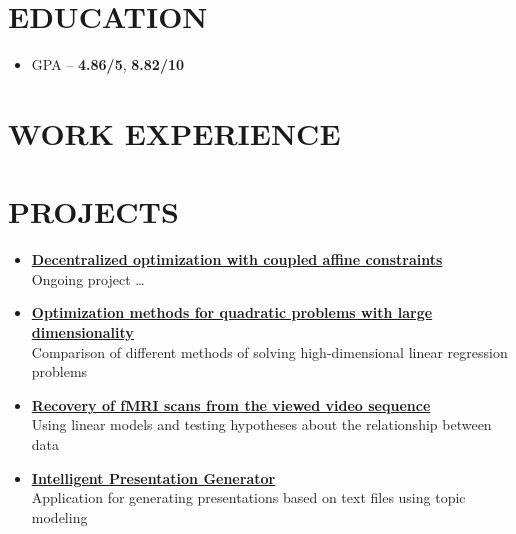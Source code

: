 \documentclass[11pt]{moderncv}
\begin{document}
    \makecvtitle

    \section{EDUCATION}

        \begin{itemize}
            \item GPA -- \textbf{4.86/5}, \textbf{8.82/10}
        \end{itemize}

    \section{WORK EXPERIENCE}


    \section{PROJECTS}

    \begin{itemize}
        \item \href{https://github.com/kisnikser/Decentralized-Optimization}{\textbf{Decentralized optimization with coupled affine constraints}}\\
        Ongoing project \dots
        \item \href{https://github.com/kisnikser/Optimization-Methods}{\textbf{Optimization methods for quadratic problems with large dimensionality}}\\
        Comparison of different methods of solving high-dimensional linear regression problems
        \item \href{https://github.com/intsystems/2023-Project-112}{\textbf{Recovery of fMRI scans from the viewed video sequence}}\\
        Using linear models and testing hypotheses about the relationship between data
        \item \href{https://github.com/kisnikser/Intelligent-Presentation-Generator}{\textbf{Intelligent Presentation Generator}}\\
        Application for generating presentations based on text files using topic modeling
    \end{itemize}   
\end{document}
